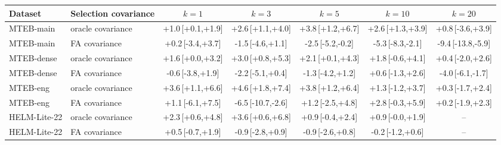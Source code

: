 \begin{tabular}{llccccc}\toprule
Dataset & Selection covariance & $k{=}1$ & $k{=}3$ & $k{=}5$ & $k{=}10$ & $k{=}20$ \\\midrule
MTEB-main & oracle covariance & +1.0\,[+0.1,+1.9] & +2.6\,[+1.1,+4.0] & +3.8\,[+1.2,+6.7] & +2.6\,[+1.3,+3.9] & +0.8\,[-3.6,+3.9] \\
MTEB-main & FA covariance & +0.2\,[-3.4,+3.7] & -1.5\,[-4.6,+1.1] & -2.5\,[-5.2,-0.2] & -5.3\,[-8.3,-2.1] & -9.4\,[-13.8,-5.9] \\
MTEB-dense & oracle covariance & +1.6\,[+0.0,+3.2] & +3.0\,[+0.8,+5.3] & +2.1\,[+0.1,+4.3] & +1.8\,[-0.6,+4.1] & +0.4\,[-2.0,+2.6] \\
MTEB-dense & FA covariance & -0.6\,[-3.8,+1.9] & -2.2\,[-5.1,+0.4] & -1.3\,[-4.2,+1.2] & +0.6\,[-1.3,+2.6] & -4.0\,[-6.1,-1.7] \\
MTEB-eng & oracle covariance & +3.6\,[+1.1,+6.6] & +4.6\,[+1.8,+7.4] & +3.8\,[+1.2,+6.4] & +1.3\,[-1.2,+3.7] & +0.3\,[-1.7,+2.4] \\
MTEB-eng & FA covariance & +1.1\,[-6.1,+7.5] & -6.5\,[-10.7,-2.6] & +1.2\,[-2.5,+4.8] & +2.8\,[-0.3,+5.9] & +0.2\,[-1.9,+2.3] \\
HELM-Lite-22 & oracle covariance & +2.3\,[+0.6,+4.8] & +3.6\,[+0.6,+6.8] & +0.9\,[-0.4,+2.4] & +0.9\,[-0.0,+1.9] & -- \\
HELM-Lite-22 & FA covariance & +0.5\,[-0.7,+1.9] & -0.9\,[-2.8,+0.9] & -0.9\,[-2.6,+0.8] & -0.2\,[-1.2,+0.6] & -- \\
\bottomrule
\end{tabular}
